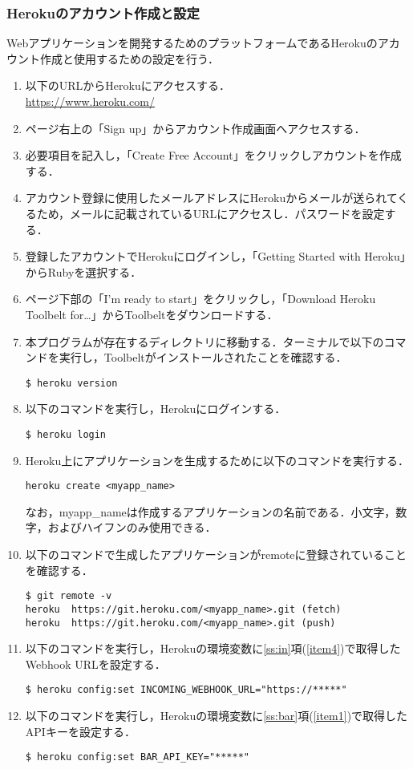 \documentclass[fleqn, 14pt]{extarticlej}
\begin{document}
\subsubsection{Herokuのアカウント作成と設定}
\label{ss:heroku}
Webアプリケーションを開発するためのプラットフォームであるHerokuのアカウント作成と使用するための設定を行う．
\begin{enumerate}
\item 以下のURLからHerokuにアクセスする．\\
  \url{https://www.heroku.com/}
\item ページ右上の「Sign up」からアカウント作成画面へアクセスする．
\item 必要項目を記入し，「Create Free Account」をクリックしアカウントを作成する．
\item アカウント登録に使用したメールアドレスにHerokuからメールが送られてくるため，メールに記載されているURLにアクセスし．パスワードを設定する．
\item 登録したアカウントでHerokuにログインし，「Getting Started with Heroku」からRubyを選択する．
\item ページ下部の「I’m ready to start」をクリックし，「Download Heroku Toolbelt for…」からToolbeltをダウンロードする．
\item 本プログラムが存在するディレクトリに移動する．ターミナルで以下のコマンドを実行し，Toolbeltがインストールされたことを確認する．
\begin{verbatim}
$ heroku version
\end{verbatim}
\item 以下のコマンドを実行し，Herokuにログインする．
\begin{verbatim}
$ heroku login
\end{verbatim}
\item \label{item2}Heroku上にアプリケーションを生成するために以下のコマンドを実行する．
\begin{verbatim}
heroku create <myapp_name>
\end{verbatim}
なお，myapp\_nameは作成するアプリケーションの名前である．小文字，数字，およびハイフンのみ使用できる．
\item 以下のコマンドで生成したアプリケーションがremoteに登録されていることを確認する．
\begin{verbatim}
$ git remote -v
heroku	https://git.heroku.com/<myapp_name>.git (fetch)
heroku	https://git.heroku.com/<myapp_name>.git (push)
\end{verbatim}
\item 以下のコマンドを実行し，Herokuの環境変数に\ref{ss:in}項(\ref{item4})で取得したWebhook URLを設定する．
\begin{verbatim}
$ heroku config:set INCOMING_WEBHOOK_URL="https://*****"
\end{verbatim}
\item 以下のコマンドを実行し，Herokuの環境変数に\ref{ss:bar}項(\ref{item1})で取得したAPIキーを設定する．
\begin{verbatim}
$ heroku config:set BAR_API_KEY="*****"
\end{verbatim}
\end{enumerate}
\end{document}
